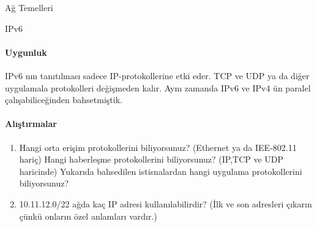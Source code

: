 \begin{section}{Ağ Temelleri}
\begin{subsection}{IPv6}
\paragraph{Uygunluk}{IPv6 nın tanıtılması sadece IP-protokollerine etki eder. TCP ve UDP ya da diğer uygulamala protokolleri değişmeden kalır. Aynı zamanda IPv6 ve IPv4 ün paralel çalışabiliceğinden bahsetmiştik.}

\paragraph{{\Huge{\PencilLeftDown}}Alıştırmalar}{
\begin{enumerate}
 \item Hangi orta erişim protokollerini biliyorsunuz? (Ethernet ya da IEE-802.11 hariç) Hangi haberleşme protokollerini biliyorsunuz? (IP,TCP ve UDP haricinde) Yukarıda bahsedilen istisnalardan hangi uygulama protokollerini biliyorsunuz?
 \item 10.11.12.0/22 ağda kaç IP adresi kullanılabilirdir? (İlk ve son adresleri çıkarın çünkü onların özel anlamları vardır.)
\end{enumerate}}
\end{subsection}
\end{section}

